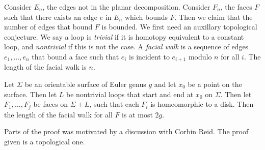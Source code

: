 Consider \(E_n\), the edges not in the planar decomposition. Consider \(F_n\), the faces \(F\) such that there exists an edge \(e\) in \(E_n\) which bounds \(F\). Then we claim that the number of edges that bound \(F\) is bounded. We first need an auxillary topological conjecture. We say a loop is \textit{trivial} if it is homotopy equivalent to a constant loop, and \textit{nontrivial} if this is not the case. A \textit{facial walk} is a sequence of edges \(e_1, \ldots, e_n\) that bound a face such that \(e_i\) is incident to \(e_{i + 1}\) modulo \(n\) for all \(i\). The length of the facial walk is \(n\). 

\begin{lemma}\label{lem:orientable_facial_walks}
	Let \(\Sigma \) be an orientable surface of Euler genus \(g\) and let \(x_0\) be a point on the surface. Then let \(L\) be nontrivial loops that start and end at \(x_0\) on \(\Sigma \). Then let \(F_1, \ldots, F_j\) be faces on \(\Sigma + L\), such that each \(F_i\) is homeomorphic to a disk. Then the length of the facial walk for all \(F\) is at most \(2g\). 
\end{lemma}

Parts of the proof was motivated by a discussion with Corbin Reid. The proof given is a topological one. 

